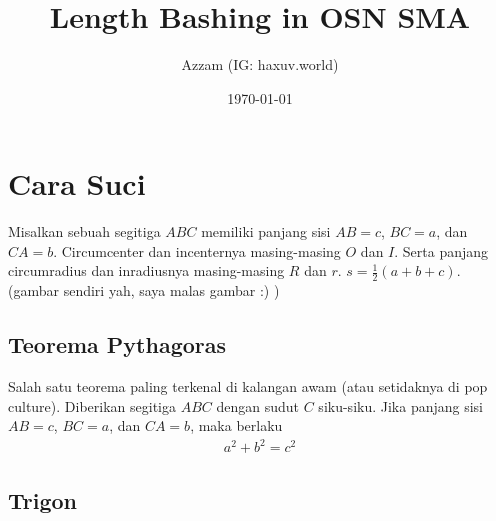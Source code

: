 \documentclass[12pt]{scrartcl}
\title{Length Bashing in OSN SMA}
\author{Azzam (IG: haxuv.world)}
\date{\today}
\begin{document}
\maketitle

\renewcommand*\contentsname{Daftar Isi}
\tableofcontents

\newpage

\section{Cara Suci}
Misalkan sebuah segitiga $ABC$ memiliki panjang sisi $AB=c$, $BC=a$, dan $CA=b$. Circumcenter dan incenternya masing-masing $O$ dan $I$. Serta panjang circumradius dan inradiusnya masing-masing $R$ dan $r$. $s=\frac{1}{2}(a+b+c)$. (gambar sendiri yah, saya malas gambar :) )

\subsection{Teorema Pythagoras}
Salah satu teorema paling terkenal di kalangan awam (atau setidaknya di pop culture). Diberikan segitiga $ABC$ dengan sudut $C$ siku-siku. Jika panjang sisi $AB=c$, $BC=a$, dan $CA=b$, maka berlaku
\begin{align*}
    a^2+b^2=c^2
\end{align*}
\begin{center}
\end{center}

\subsection{Trigon}
\end{document}
